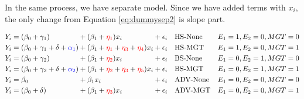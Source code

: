 \documentclass[]{book}
\theoremstyle{definition}
\theoremstyle{definition}
\theoremstyle{definition}
\theoremstyle{remark}
\begin{document}
In the same process, we have separate model. Since we have added terms with \(x_i\), the only change from Equation \eqref{eq:dummysep2} is slope part.

\begin{equation}
  \begin{alignedat}{5}
    & Y_i = (\beta_0 + \gamma_1) && + (\beta_1 + {\color{red}{\eta_1}}) x_i && + \epsilon_i && \quad \text{HS-None} && \quad E_1 = 1, E_2 = 0, MGT = 0 \\
    & Y_i = (\beta_0 + \gamma_1 + \delta + {\color{blue}{\alpha_1}}) && + (\beta_1 + {\color{red}{\eta_1}} + {\color{red}{\eta_3}} + {\color{red}{\eta_4}}) x_i && + \epsilon_i && \quad \text{HS-MGT} && \quad E_1 = 1, E_2 = 0, MGT = 1 \\
    & Y_i = (\beta_0 + \gamma_2) && + (\beta_1 + {\color{red}{\eta_2}}) x_i && + \epsilon_i && \quad \text{BS-None} && \quad E_1 = 0, E_2 = 1, MGT = 0 \\
    & Y_i = (\beta_0 + \gamma_2 + \delta + {\color{blue}{\alpha_2}}) && + (\beta_1 + {\color{red}{\eta_2}} + {\color{red}{\eta_3}} + {\color{red}{\eta_5}}) x_i && + \epsilon_i && \quad \text{BS-MGT} && \quad E_1 = 0, E_2 = 1, MGT = 1 \\
    & Y_i = \beta_0 && + \beta_1 x_i && + \epsilon_i && \quad \text{ADV-None} && \quad E_1 = 0, E_2 = 0, MGT = 0 \\
    & Y_i = (\beta_0 + \delta) && + (\beta_1 + {\color{red}{\eta_3}}) x_i && + \epsilon_i && \quad \text{ADV-MGT} && \quad E_1 = 0, E_2 = 0, MGT = 1
  \end{alignedat}
  \label{eq:dummysep3}
\end{equation}
\end{document}
